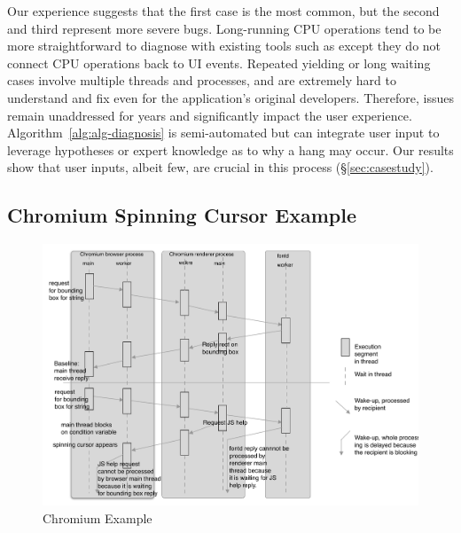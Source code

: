 \noindent
Our experience suggests that the first case is the most common, but the
second and third represent more severe bugs. Long-running CPU operations tend to
be more straightforward to diagnose with existing tools such as \spindump except
they do not connect CPU operations back to UI events. Repeated yielding or
long waiting cases involve multiple threads and processes, and are extremely
hard to understand and fix even for the application's original developers.
Therefore, issues remain unaddressed for years and significantly impact the
user experience. Algorithm~\ref{alg:alg-diagnosis} is semi-automated but can
integrate user input to leverage hypotheses or expert knowledge
as to why a hang may occur. Our results show that user inputs, albeit few, are
crucial in this process (\S\ref{sec:casestudy}).

\subsection{Chromium Spinning Cursor Example}

\begin{figure}[tb]
	\footnotesize
    \centering
	\includegraphics[width=\columnwidth]{./figures/chromium_case_study_2.pdf}
	\caption{Chromium Example}
    \label{fig:chromium-case-study}
\end{figure}

